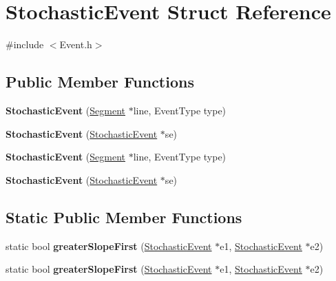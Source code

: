 \hypertarget{structStochasticEvent}{\section{Stochastic\-Event Struct Reference}
\label{structStochasticEvent}
}


{\ttfamily \#include $<$Event.\-h$>$}

\subsection*{Public Member Functions}
\begin{DoxyCompactItemize}
\item 
\hypertarget{structStochasticEvent_a6e3ed7abc6f78772300a5b94d64638c8}{{\bfseries Stochastic\-Event} (\hyperlink{classSegment}{Segment} $\ast$line, Event\-Type type)}\label{structStochasticEvent_a6e3ed7abc6f78772300a5b94d64638c8}

\item 
\hypertarget{structStochasticEvent_a37f3e2bc477fa20547b21876551450ca}{{\bfseries Stochastic\-Event} (\hyperlink{structStochasticEvent}{Stochastic\-Event} $\ast$se)}\label{structStochasticEvent_a37f3e2bc477fa20547b21876551450ca}

\item 
\hypertarget{structStochasticEvent_a6e3ed7abc6f78772300a5b94d64638c8}{{\bfseries Stochastic\-Event} (\hyperlink{classSegment}{Segment} $\ast$line, Event\-Type type)}\label{structStochasticEvent_a6e3ed7abc6f78772300a5b94d64638c8}

\item 
\hypertarget{structStochasticEvent_a37f3e2bc477fa20547b21876551450ca}{{\bfseries Stochastic\-Event} (\hyperlink{structStochasticEvent}{Stochastic\-Event} $\ast$se)}\label{structStochasticEvent_a37f3e2bc477fa20547b21876551450ca}

\end{DoxyCompactItemize}
\subsection*{Static Public Member Functions}
\begin{DoxyCompactItemize}
\item 
\hypertarget{structStochasticEvent_a3fee00f7e0b02f6fa83191c903f051a8}{static bool {\bfseries greater\-Slope\-First} (\hyperlink{structStochasticEvent}{Stochastic\-Event} $\ast$e1, \hyperlink{structStochasticEvent}{Stochastic\-Event} $\ast$e2)}\label{structStochasticEvent_a3fee00f7e0b02f6fa83191c903f051a8}

\item 
\hypertarget{structStochasticEvent_a3fee00f7e0b02f6fa83191c903f051a8}{static bool {\bfseries greater\-Slope\-First} (\hyperlink{structStochasticEvent}{Stochastic\-Event} $\ast$e1, \hyperlink{structStochasticEvent}{Stochastic\-Event} $\ast$e2)}\label{structStochasticEvent_a3fee00f7e0b02f6fa83191c903f051a8}

\end{DoxyCompactItemize}
